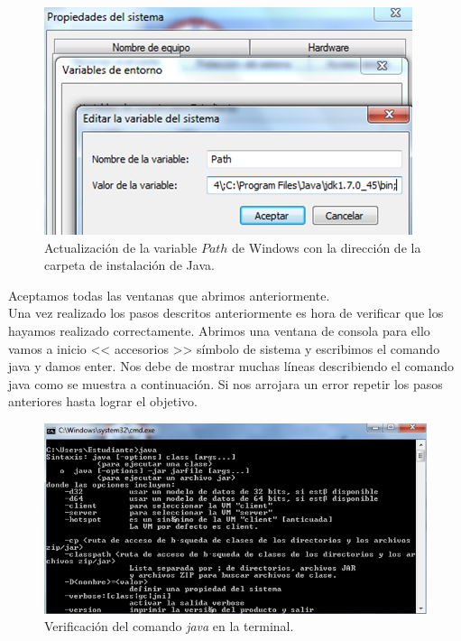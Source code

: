 \begin{figure}[H]
	\begin{center}
		\includegraphics[scale=.4]{images/instalaciones/java/img_java_14}
		\caption{Actualización de la variable $Path$ de Windows con la dirección de 
		la carpeta de instalación de Java.}
	\end{center}
\end{figure}

Aceptamos todas las ventanas que abrimos anteriormente.\\ 
Una vez realizado los
pasos descritos anteriormente es hora de verificar que los hayamos realizado
correctamente. Abrimos una ventana de consola para ello vamos a inicio <<
accesorios >> símbolo de sistema y escribimos el comando java y damos enter.
Nos debe de mostrar muchas líneas describiendo el comando java como se muestra a
continuación. Si nos arrojara un error repetir los pasos anteriores hasta lograr
el objetivo.    

\begin{figure}[H]
	\begin{center}
		\includegraphics[scale=.4]{images/instalaciones/java/img_java_15}
		\caption{Verificación del comando \textit{java} en la terminal.}
	\end{center}
\end{figure}
 
